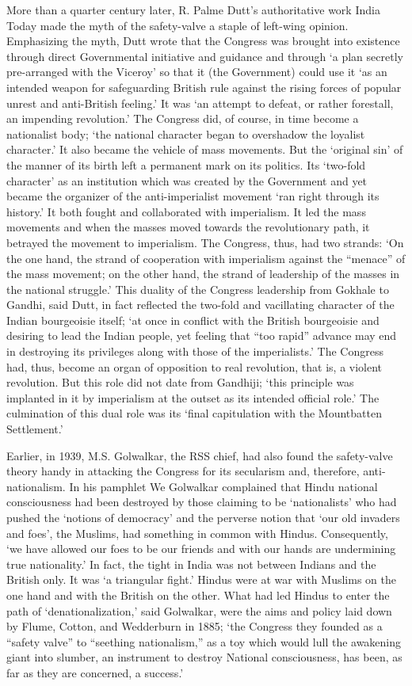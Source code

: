 More than a quarter century later, R. Palme Dutt’s authoritative work India Today made the myth of the safety-valve a staple of left-wing opinion. Emphasizing the myth, Dutt wrote that the Congress was brought into existence through direct Governmental initiative and guidance and through ‘a plan secretly pre-arranged with the Viceroy’ so that it (the Government) could use it ‘as an intended weapon for safeguarding British rule against the rising forces of popular unrest and anti-British feeling.’ It was ‘an attempt to defeat, or rather forestall, an impending revolution.’ The Congress did, of course, in time become a nationalist body; ‘the national character began to overshadow the loyalist character.’ It also became the vehicle of mass movements. But the ‘original sin’ of the manner of its birth left a permanent mark on its politics. Its ‘two-fold character’ as an institution which was created by the Government and yet became the organizer of the anti-imperialist movement ‘ran right through its history.’ It both fought and collaborated with imperialism. It led the mass movements and when the masses moved towards the revolutionary path, it betrayed the movement to imperialism. The Congress, thus, had two strands: ‘On the one hand, the strand of cooperation with imperialism against the “menace” of the mass movement; on the other hand, the strand of leadership of the masses in the national struggle.’ This duality of the Congress leadership from Gokhale to Gandhi, said Dutt, in fact reflected the two-fold and vacillating character of the Indian bourgeoisie itself; ‘at once in conflict with the British bourgeoisie and desiring to lead the Indian people, yet feeling that “too rapid” advance may end in destroying its privileges along with those of the imperialists.’ The Congress had, thus, become an organ of opposition to real revolution, that is, a violent revolution. But this role did not date from Gandhiji; ‘this principle was implanted in it by imperialism at the outset as its intended official role.’ The culmination of this dual role was its ‘final capitulation with the Mountbatten Settlement.’

Earlier, in 1939, M.S. Golwalkar, the RSS chief, had also found the safety-valve theory handy in attacking the Congress for its secularism and, therefore, anti-nationalism. In his pamphlet We Golwalkar complained that Hindu national consciousness had been destroyed by those claiming to be ‘nationalists’ who had pushed the ‘notions of democracy’ and the perverse notion that ‘our old invaders and foes’, the Muslims, had something in common with Hindus. Consequently, ‘we have allowed our foes to be our friends and with our hands are undermining true nationality.’ In fact, the tight in India was not between Indians and the British only. It was ‘a triangular fight.’ Hindus were at war with Muslims on the one hand and with the British on the other. What had led Hindus to enter the path of ‘denationalization,’ said Golwalkar, were the aims and policy laid down by Flume, Cotton, and Wedderburn in 1885; ‘the Congress they founded as a “safety valve” to “seething nationalism,” as a toy which would lull the awakening giant into slumber, an instrument to destroy National consciousness, has been, as far as they are concerned, a success.’

